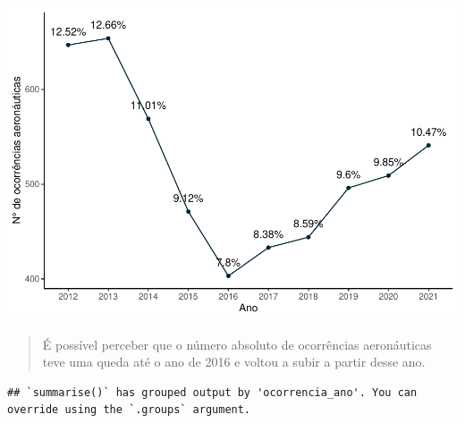 \documentclass[
]{article}
\newenvironment{Shaded}{\begin{snugshade}}{\end{snugshade}}
\newcommand{\AttributeTok}[1]{\textcolor[rgb]{0.77,0.63,0.00}{#1}}
\newcommand{\FunctionTok}[1]{\textcolor[rgb]{0.00,0.00,0.00}{#1}}
\newcommand{\NormalTok}[1]{#1}
\newcommand{\OtherTok}[1]{\textcolor[rgb]{0.56,0.35,0.01}{#1}}
\newcommand{\SpecialCharTok}[1]{\textcolor[rgb]{0.00,0.00,0.00}{#1}}
\newcommand{\StringTok}[1]{\textcolor[rgb]{0.31,0.60,0.02}{#1}}
\begin{document}
\begin{center}\includegraphics{4.Relatorio/pdf/index_files/figure-latex/unnamed-chunk-21-1} \end{center}

\begin{quote}
É possível perceber que o número absoluto de ocorrências aeronáuticas
teve uma queda até o ano de 2016 e voltou a subir a partir desse ano.
\end{quote}

\begin{Shaded}
\end{Shaded}

\begin{verbatim}
## `summarise()` has grouped output by 'ocorrencia_ano'. You can override using the `.groups` argument.
\end{verbatim}
\end{document}
